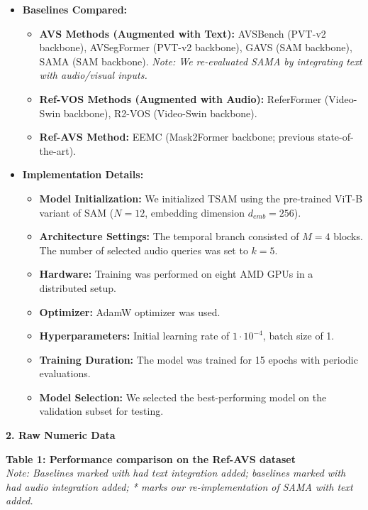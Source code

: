 \begin{itemize}
    \item \textbf{Baselines Compared:}
    \begin{itemize}
        \item \textbf{AVS Methods (Augmented with Text):} AVSBench (PVT-v2 backbone), AVSegFormer (PVT-v2 backbone), GAVS (SAM backbone), SAMA (SAM backbone). \textit{Note: We re-evaluated SAMA by integrating text with audio/visual inputs.}
        \item \textbf{Ref-VOS Methods (Augmented with Audio):} ReferFormer (Video-Swin backbone), R2-VOS (Video-Swin backbone).
        \item \textbf{Ref-AVS Method:} EEMC (Mask2Former backbone; previous state-of-the-art).
    \end{itemize}
    
    \item \textbf{Implementation Details:}
    \begin{itemize}
        \item \textbf{Model Initialization:} We initialized TSAM using the pre-trained ViT-B variant of SAM ($N=12$, embedding dimension $d_{emb}=256$).
        \item \textbf{Architecture Settings:} The temporal branch consisted of $M=4$ blocks. The number of selected audio queries was set to $k=5$.
        \item \textbf{Hardware:} Training was performed on eight AMD GPUs in a distributed setup.
        \item \textbf{Optimizer:} AdamW optimizer was used.
        \item \textbf{Hyperparameters:} Initial learning rate of $1 \cdot 10^{-4}$, batch size of 1.
        \item \textbf{Training Duration:} The model was trained for 15 epochs with periodic evaluations.
        \item \textbf{Model Selection:} We selected the best-performing model on the validation subset for testing.
    \end{itemize}
\end{itemize}

\vspace{1em}
\noindent\textbf{2. Raw Numeric Data}

\vspace{0.5em}
\noindent\textbf{Table 1: Performance comparison on the Ref-AVS dataset}\\
\textit{Note: Baselines marked with \dag{} had text integration added; baselines marked with \ddag{} had audio integration added; * marks our re-implementation of SAMA with text added.}

